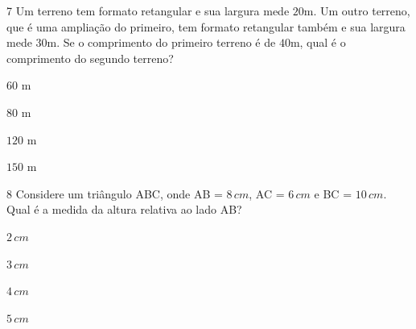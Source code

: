 \num{7}  Um terreno tem formato retangular e sua largura mede $20$m. Um outro
terreno, que é uma ampliação do primeiro, tem formato retangular também
e sua largura mede $30$m. Se o comprimento do primeiro terreno é de $40$m,
qual é o comprimento do segundo terreno?

\begin{escolha}
\item $60$ m
\item $80$ m
\item $120$ m
\item $150$ m
\end{escolha}



\num{8}  Considere um triângulo ABC, onde AB = $8\,cm$, AC = $6\,cm$ e BC = $10\,cm$.
Qual é a medida da altura relativa ao lado AB?

\begin{escolha}
\item $2\,cm$
\item $3\,cm$
\item $4\,cm$
\item $5\,cm$
\end{escolha}


